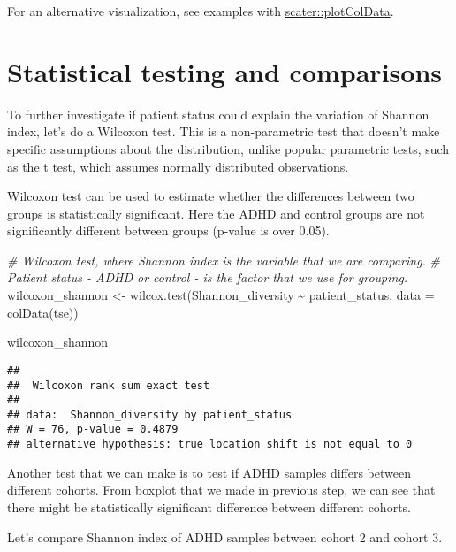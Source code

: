 \documentclass[
  oneside]{book}
\newenvironment{Shaded}{\begin{snugshade}}{\end{snugshade}}
\newcommand{\AttributeTok}[1]{\textcolor[rgb]{0.77,0.63,0.00}{#1}}
\newcommand{\CommentTok}[1]{\textcolor[rgb]{0.56,0.35,0.01}{\textit{#1}}}
\newcommand{\FunctionTok}[1]{\textcolor[rgb]{0.00,0.00,0.00}{#1}}
\newcommand{\NormalTok}[1]{#1}
\newcommand{\OtherTok}[1]{\textcolor[rgb]{0.56,0.35,0.01}{#1}}
\newcommand{\SpecialCharTok}[1]{\textcolor[rgb]{0.00,0.00,0.00}{#1}}
\begin{document}
For an alternative visualization, see examples with \href{https://microbiome.github.io/OMA/microbiome-diversity.html\#alpha-diversity}{scater::plotColData}.

\hypertarget{statistical-testing-and-comparisons}{%
\section{Statistical testing and comparisons}\label{statistical-testing-and-comparisons}}

To further investigate if patient status could explain the variation
of Shannon index, let's do a Wilcoxon test. This is a non-parametric
test that doesn't make specific assumptions about the distribution,
unlike popular parametric tests, such as the t test, which assumes
normally distributed observations.

Wilcoxon test can be used to estimate whether the differences between
two groups is statistically significant. Here the ADHD and control
groups are not significantly different between groups (p-value is over
0.05).

\begin{Shaded}
\begin{Highlighting}[]
\CommentTok{\# Wilcoxon test, where Shannon index is the variable that we are comparing. }
\CommentTok{\# Patient status {-} ADHD or control {-} is the factor that we use for grouping. }
\NormalTok{wilcoxon\_shannon }\OtherTok{\textless{}{-}} \FunctionTok{wilcox.test}\NormalTok{(Shannon\_diversity }\SpecialCharTok{\textasciitilde{}}\NormalTok{ patient\_status, }\AttributeTok{data =} \FunctionTok{colData}\NormalTok{(tse))}

\NormalTok{wilcoxon\_shannon}
\end{Highlighting}
\end{Shaded}

\begin{verbatim}
## 
##  Wilcoxon rank sum exact test
## 
## data:  Shannon_diversity by patient_status
## W = 76, p-value = 0.4879
## alternative hypothesis: true location shift is not equal to 0
\end{verbatim}

Another test that we can make is to test if ADHD samples differs between different
cohorts. From boxplot that we made in previous step, we can see that there might
be statistically significant difference between different cohorts.

Let's compare Shannon index of ADHD samples between cohort 2 and cohort 3.
\end{document}
